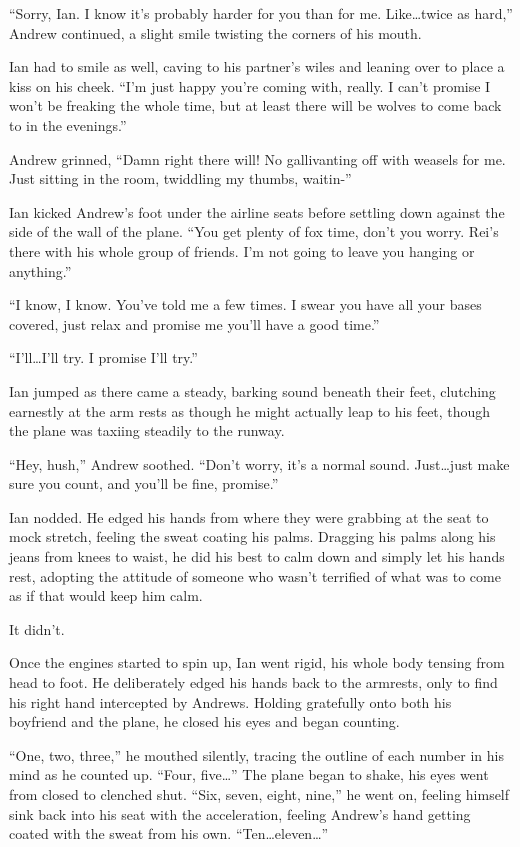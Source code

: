 \documentclass[12pt,letterpaper,oneside]{memoir}
\begin{document}
  ``Sorry, Ian. I know it's probably harder for you than for me. Like\ldots{}twice as hard,'' Andrew continued, a slight smile twisting the corners of his mouth.

  Ian had to smile as well, caving to his partner's wiles and leaning over to place a kiss on his cheek. ``I'm just happy you're coming with, really. I can't promise I won't be freaking the whole time, but at least there will be wolves to come back to in the evenings.''

  Andrew grinned, ``Damn right there will! No gallivanting off with weasels for me. Just sitting in the room, twiddling my thumbs, waitin-''

  Ian kicked Andrew's foot under the airline seats before settling down against the side of the wall of the plane. ``You get plenty of fox time, don't you worry. Rei's there with his whole group of friends. I'm not going to leave you hanging or anything.''

  ``I know, I know. You've told me a few times. I swear you have all your bases covered, just relax and promise me you'll have a good time.''

  ``I'll\ldots{}I'll try. I promise I'll try.''

  Ian jumped as there came a steady, barking sound beneath their feet, clutching earnestly at the arm rests as though he might actually leap to his feet, though the plane was taxiing steadily to the runway.

  ``Hey, hush,'' Andrew soothed. ``Don't worry, it's a normal sound. Just\ldots{}just make sure you count, and you'll be fine, promise.''

  Ian nodded. He edged his hands from where they were grabbing at the seat to mock stretch, feeling the sweat coating his palms. Dragging his palms along his jeans from knees to waist, he did his best to calm down and simply let his hands rest, adopting the attitude of someone who wasn't terrified of what was to come as if that would keep him calm.

  It didn't.

  Once the engines started to spin up, Ian went rigid, his whole body tensing from head to foot. He deliberately edged his hands back to the armrests, only to find his right hand intercepted by Andrews. Holding gratefully onto both his boyfriend and the plane, he closed his eyes and began counting.

  ``One, two, three,'' he mouthed silently, tracing the outline of each number in his mind as he counted up. ``Four, five\ldots{}'' The plane began to shake, his eyes went from closed to clenched shut. ``Six, seven, eight, nine,'' he went on, feeling himself sink back into his seat with the acceleration, feeling Andrew's hand getting coated with the sweat from his own. ``Ten\ldots{}eleven\ldots{}''
\end{document}
